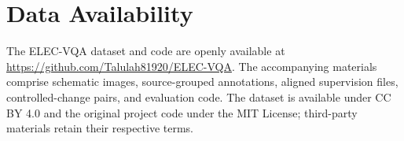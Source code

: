 \section*{Data Availability}
The ELEC-VQA dataset and code are openly available at \url{https://github.com/Talulah81920/ELEC-VQA}. The accompanying materials comprise schematic images, source-grouped annotations, aligned supervision files, controlled-change pairs, and evaluation code. The dataset is available under CC BY 4.0 and the original project code under the MIT License; third-party materials retain their respective terms.

